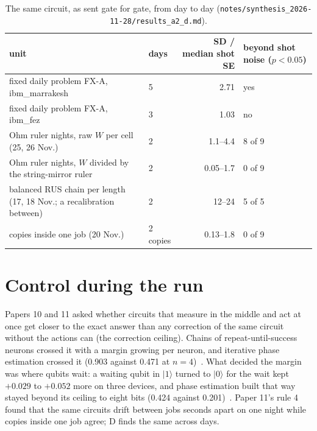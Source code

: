 \documentclass[10pt,a4paper]{article}
\newcommand{\ket}[1]{|#1\rangle}
\begin{document}
\begin{table}[H]\centering\footnotesize
\begin{tabular}{R{6.4cm}lrl}
\toprule
unit & days & SD / median shot SE & beyond shot noise ($p < 0.05$) \\
\midrule
fixed daily problem FX-A, ibm\_marrakesh & 5 & 2.71 & yes \\
fixed daily problem FX-A, ibm\_fez & 3 & 1.03 & no \\
Ohm ruler nights, raw $W$ per cell (25, 26 Nov.) & 2 & 1.1--4.4 & 8 of 9 \\
Ohm ruler nights, $W$ divided by the string-mirror ruler & 2 & 0.05--1.7 & 0 of 9 \\
balanced RUS chain per length (17, 18 Nov.; a recalibration between) & 2 & 12--24 & 5 of 5 \\
\midrule
copies inside one job (20 Nov.) & 2 copies & 0.13--1.8 & 0 of 9 \\
\bottomrule
\end{tabular}
\caption{The same circuit, as sent gate for gate, from day to day (\texttt{notes/synthesis\_2026-11-28/results\_a2\_d.md}).}\label{tab:spread}
\end{table}

\section{Control during the run}\label{sec:control}
Papers 10 and 11 asked whether circuits that measure in the middle and act at once get closer to the exact answer than
any correction of the same circuit without the actions can (the correction ceiling). Chains of repeat-until-success
neurons crossed it with a margin growing per neuron, and iterative phase estimation crossed it (0.903 against 0.471 at
$n = 4$)~\cite{p10}. What decided the margin was where qubits wait: a waiting qubit in $\ket{1}$ turned to $\ket{0}$ for
the wait kept $+0.029$ to $+0.052$ more on three devices, and phase estimation built that way stayed beyond its ceiling
to eight bits (0.424 against 0.201)~\cite{p11}. Paper 11's rule 4 found that the same circuits drift between jobs
seconds apart on one night while copies inside one job agree; D finds the same across days.
\end{document}
